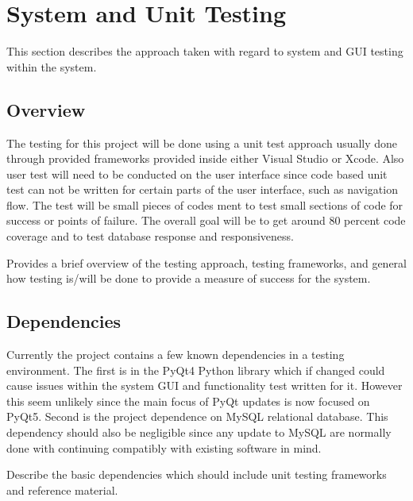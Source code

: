 
\chapter{System  and Unit Testing}

This section describes the approach taken with regard to system and GUI testing within the system. 

\section{Overview}
The testing for this project will be done using a unit test approach usually done through provided frameworks provided inside either Visual Studio or Xcode. Also user test will need to be conducted on the user interface since code based unit test can not be written for certain parts of the user interface, such as navigation flow. The test will be small pieces of codes ment to test small sections of code for success or points of failure. The overall goal will be to get around 80 percent code coverage and to test database response and responsiveness.

Provides a brief overview of the testing approach, testing frameworks, and general 
how testing is/will be done to provide a measure of success for the system. 



\section{Dependencies}
Currently the project contains a few known dependencies in a testing environment. The first is in the PyQt4 Python library which if changed could cause issues within the system GUI and functionality test written for it. However this seem unlikely since the main focus of PyQt updates is now focused on PyQt5. Second is the project dependence on MySQL relational database. This dependency should also be negligible since any update to MySQL are normally done with continuing compatibly with existing software in mind.

Describe the basic dependencies which should include unit testing frameworks and 
reference material. 


